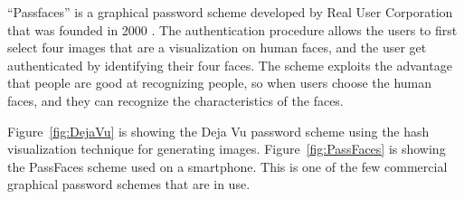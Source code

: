   ``Passfaces'' is a graphical password scheme developed by Real User Corporation that was founded in 2000 \cite{passface}. The authentication procedure allows the users to first select four images that are a visualization on human faces, and the user get authenticated by identifying their four faces. The scheme exploits the advantage that people are good at recognizing people, so when users choose the human faces, and they can recognize the characteristics of the faces.

  Figure~\ref{fig:DejaVu} is showing the Deja Vu password scheme using the hash visualization technique for generating images. Figure~\ref{fig:PassFaces} is showing the PassFaces scheme used on a smartphone. This is one of the few commercial graphical password schemes that are in use.

  \begin{figure}[H]
    \centering
    \ContinuedFloat
  \end{figure}

